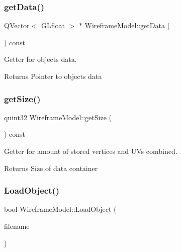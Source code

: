 \subsubsection{\texorpdfstring{get\+Data()}{getData()}}
{\footnotesize\ttfamily Q\+Vector$<$ G\+Lfloat $>$ $\ast$ Wireframe\+Model\+::get\+Data (\begin{DoxyParamCaption}{ }\end{DoxyParamCaption}) const}



Getter for object\textquotesingle{}s data. 

\begin{DoxyReturn}{Returns}
Pointer to object\textquotesingle{}s data 
\end{DoxyReturn}
\mbox{\label{class_wireframe_model_a5fc0323e4618b80e1b2b227f2470b6a0}} 
\subsubsection{\texorpdfstring{get\+Size()}{getSize()}}
{\footnotesize\ttfamily quint32 Wireframe\+Model\+::get\+Size (\begin{DoxyParamCaption}{ }\end{DoxyParamCaption}) const}



Getter for amount of stored vertices and UV\textquotesingle{}s combined. 

\begin{DoxyReturn}{Returns}
Size of data container 
\end{DoxyReturn}
\mbox{\label{class_wireframe_model_ac5f8817ea433184dda70ee25633043ae}} 
\subsubsection{\texorpdfstring{Load\+Object()}{LoadObject()}}
{\footnotesize\ttfamily bool Wireframe\+Model\+::\+Load\+Object (\begin{DoxyParamCaption}\item[{const Q\+String}]{filename }\end{DoxyParamCaption})}



